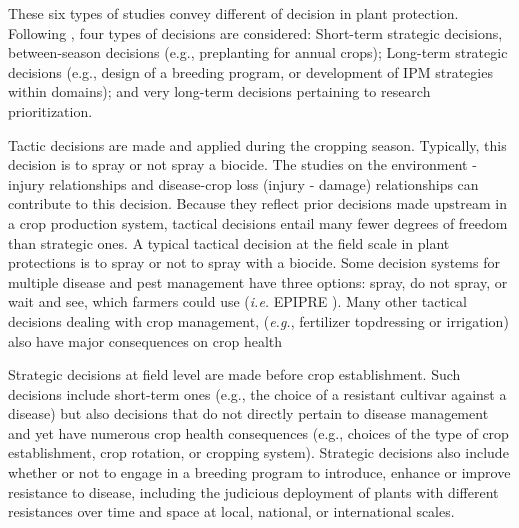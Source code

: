 These six types of studies convey different of decision in plant protection. Following \citet{Savary:2006to}, four types of decisions are considered: Short-term strategic decisions, between-season decisions (e.g., preplanting for annual crops);  Long-term strategic decisions (e.g., design of a breeding program, or development of IPM strategies within domains); and very long-term decisions pertaining to research prioritization.

Tactic decisions are made and applied during the cropping season. Typically, this decision is to spray or not spray a biocide. The studies on the environment - injury relationships and disease-crop loss (injury - damage) relationships can contribute to this decision. Because they reflect prior decisions made upstream in a crop production system, tactical decisions entail many fewer degrees of freedom than strategic ones. A typical tactical decision at the field scale in plant protections is to spray or not to spray with a biocide. Some decision systems for multiple disease and pest management have three options: spray, do not spray, or wait and see, which farmers could use (\textit{i.e.} EPIPRE \citep{zadoks1988epipre}). Many other tactical decisions dealing with crop management, (\textit{e.g.}, fertilizer topdressing or irrigation) also have major consequences on crop health \cite{Savary:2006to}

Strategic decisions at field level are made before crop establishment. Such decisions include short-term ones (e.g., the choice of a resistant cultivar against a disease) but also decisions that do not directly pertain to disease management and yet have numerous crop health consequences (e.g., choices of the type of crop establishment, crop rotation, or cropping system). Strategic decisions also include whether or not to engage in a breeding program to introduce, enhance or improve resistance to disease, including the judicious deployment of plants with different resistances over time and space at local, national, or international scales. 

